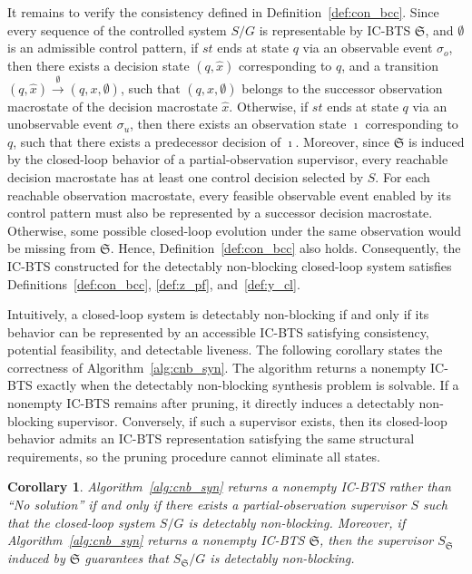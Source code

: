 \documentclass[twocolumn]{autart}
\newtheorem{mycol}{\bf Corollary}
\begin{document}
\begin{pf}
It remains to verify the consistency defined in Definition~\ref{def:con_bcc}.
Since every sequence of the controlled system $S / G$ is representable by IC-BTS $\mathfrak{S}$, and $\emptyset$ is an admissible control pattern, if $st$ ends at state $q$ via an observable event $\sigma_o$, then there exists a decision state $(q, \hat{x})$ corresponding to $q$, and a transition $(q, \hat{x}) \xrightarrow{\emptyset} (q, x, \emptyset)$, such that $(q, x, \emptyset)$ belongs to the successor observation macrostate of the decision macrostate $\hat{x}$.
Otherwise, if $st$ ends at state $q$ via an unobservable event $\sigma_u$, then there exists an observation state $\imath$ corresponding to $q$, such that there exists a predecessor decision of $\imath$.
Moreover, since ${\mathfrak{S}}$ is induced by the closed-loop behavior of a partial-observation supervisor, every reachable decision macrostate has at least one control decision selected by $S$.
For each reachable observation macrostate, every feasible observable event enabled by its control pattern must also be represented by a successor decision macrostate.
Otherwise, some possible closed-loop evolution under the same observation would be missing from $\mathfrak{S}$.
Hence, Definition~\ref{def:con_bcc} also holds.
Consequently, the IC-BTS constructed for the detectably non-blocking closed-loop system satisfies Definitions~\ref{def:con_bcc}, \ref{def:z_pf}, and~\ref{def:y_cl}.
\end{pf}

Intuitively, a closed-loop system is detectably non-blocking if and only if its behavior can be represented by an accessible IC-BTS satisfying consistency, potential feasibility, and detectable liveness.
The following corollary states the correctness of Algorithm~\ref{alg:cnb_syn}.
The algorithm returns a nonempty IC-BTS exactly when the detectably non-blocking synthesis problem is solvable.
If a nonempty IC-BTS remains after pruning, it directly induces a detectably non-blocking supervisor.
Conversely, if such a supervisor exists, then its closed-loop behavior admits an IC-BTS representation satisfying the same structural requirements, so the pruning procedure cannot eliminate all states.

\begin{mycol}\label{cor:alg_cnb_sound}
Algorithm~\ref{alg:cnb_syn} returns a nonempty IC-BTS rather than ``No solution'' if and only if there exists a partial-observation supervisor $S$ such that the closed-loop system $S/G$ is detectably non-blocking.
Moreover, if Algorithm~\ref{alg:cnb_syn} returns a nonempty IC-BTS $\mathfrak{S}$, then the supervisor $S_{\mathfrak{S}}$ induced by $\mathfrak{S}$ guarantees that $S_{\mathfrak{S}}/G$ is detectably non-blocking.
\end{mycol}
\end{document}
